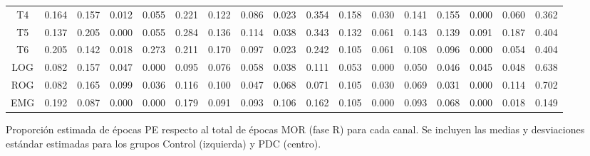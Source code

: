 \documentclass[12pt,a4paper]{mitthesis}
\begin{document}
\begin{SidewaysFigure}
\begin{tabular}{c||ccccc|cc||cccc|cc||ccc}
T4&0.164&0.157&0.012&0.055&0.221&0.122&0.086&0.023&0.354&0.158&0.030&0.141&0.155&0.000&0.060&0.362 \\
T5&0.137&0.205&0.000&0.055&0.284&0.136&0.114&0.038&0.343&0.132&0.061&0.143&0.139&0.091&0.187&0.404 \\
T6&0.205&0.142&0.018&0.273&0.211&0.170&0.097&0.023&0.242&0.105&0.061&0.108&0.096&0.000&0.054&0.404 \\
LOG&0.082&0.157&0.047&0.000&0.095&0.076&0.058&0.038&0.111&0.053&0.000&0.050&0.046&0.045&0.048&0.638 \\
ROG&0.082&0.165&0.099&0.036&0.116&0.100&0.047&0.068&0.071&0.105&0.030&0.069&0.031&0.000&0.114&0.702 \\
EMG&0.192&0.087&0.000&0.000&0.179&0.091&0.093&0.106&0.162&0.105&0.000&0.093&0.068&0.000&0.018&0.149
\end{tabular}
\caption{Proporci\'on estimada de \'epocas PE respecto al total de \'epocas MOR 
(fase R) para cada
canal. Se incluyen las medias y desviaciones est\'andar estimadas para los grupos 
Control (izquierda) y PDC (centro).}
\label{gpos_mor}
\end{SidewaysFigure}
\end{document}
